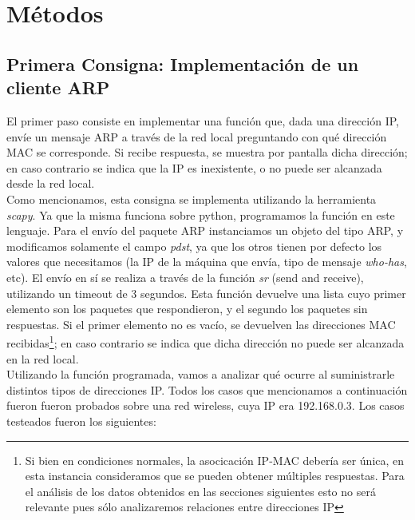 \section{M\'etodos}


\subsection{Primera Consigna: Implementaci\'on de un cliente ARP}\label{sec:metodos_1}
El primer paso consiste en implementar una funci\'on que, dada una direcci\'on IP, env\'ie un mensaje ARP a trav\'es de la red local preguntando con qu\'e direcci\'on MAC se corresponde. Si recibe respuesta, se muestra por pantalla dicha direcci\'on; en caso contrario se indica que la IP es inexistente, o no puede ser alcanzada desde la red local.\\

Como mencionamos, esta consigna se implementa utilizando la herramienta \emph{scapy}. Ya que la misma funciona sobre python, programamos la funci\'on en este lenguaje. Para el env\'io del paquete ARP instanciamos un objeto del tipo ARP, y modificamos solamente el campo \emph{pdst}, ya que los otros tienen por defecto los valores que necesitamos (la IP de la m\'aquina que env\'ia, tipo de mensaje \emph{who-has}, etc). El env\'io en s\'i se realiza a trav\'es de la funci\'on \emph{sr} (send and receive), utilizando un timeout de 3 segundos. Esta funci\'on devuelve una lista cuyo primer elemento son los paquetes que respondieron, y el segundo los paquetes sin respuestas. Si el primer elemento no es vac\'io, se devuelven las direcciones MAC  recibidas\footnote{Si bien en condiciones normales, la asocicación IP-MAC debería ser única, en esta instancia consideramos que se pueden obtener múltiples respuestas. Para el análisis de los datos obtenidos en las secciones siguientes esto no será relevante pues sólo analizaremos relaciones entre direcciones IP}; en caso contrario se indica que dicha direcci\'on no puede ser alcanzada en la red local. \\

Utilizando la funci\'on programada, vamos a analizar qu\'e ocurre al suministrarle distintos tipos de direcciones IP. Todos los casos que mencionamos a continuaci\'on fueron fueron probados sobre una red wireless, cuya IP era 192.168.0.3. Los casos testeados fueron los siguientes:


